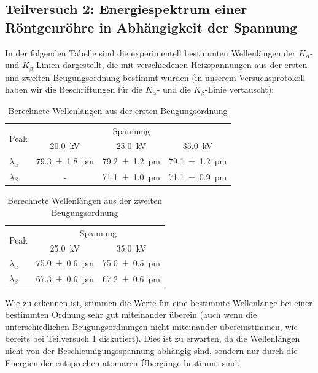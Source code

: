 \documentclass{article}
\begin{document}
\newpage


\subsection{Teilversuch 2: Energiespektrum einer Röntgenröhre
in Abhängigkeit der Spannung}


In der folgenden Tabelle sind die experimentell bestimmten Wellenlängen
der $K_\alpha$- und $K_\beta$-Linien dargestellt, die mit verschiedenen
Heizspannungen aus der ersten und zweiten Beugungsordnung bestimmt wurden
(in unserem Versuchsprotokoll haben wir die Beschriftungen für die $K_\alpha$-
und die $K_\beta$-Linie vertauscht):

\begin{table}[H]
    \centering
    \begin{tabular}{|l|ccc|}
        \hline
        \multirow{2}{*}{Peak} & \multicolumn{3}{c|}{Spannung} \\
        & \qty{20.0}{\kV} & \qty{25.0}{\kV} & \qty{35.0}{\kV} \\
        \hline
        $\lambda_\alpha$ & \qty{79.3 \pm 1.8}{\pm} & \qty{79.2 \pm 1.2}{\pm}
        & \qty{79.1 \pm 1.2}{\pm} \\
        $\lambda_\beta$ & - & \qty{71.1 \pm 1.0}{\pm} & \qty{71.1 \pm 0.9}{\pm} \\
        \hline
    \end{tabular}
    \caption{Berechnete Wellenlängen aus der ersten Beugungsordnung}
\end{table}

\begin{table}[H]
    \centering
    \begin{tabular}{|l|cc|}
        \hline
        \multirow{2}{*}{Peak} & \multicolumn{2}{c|}{Spannung} \\
        & \qty{25.0}{\kV} & \qty{35.0}{\kV} \\
        \hline
        $\lambda_\alpha$ & \qty{75.0 \pm 0.6}{\pm} & \qty{75.0 \pm 0.5}{\pm} \\
        $\lambda_\beta$ & \qty{67.3 \pm 0.6}{\pm} & \qty{67.2 \pm 0.6}{\pm} \\
        \hline
    \end{tabular}
    \caption{Berechnete Wellenlängen aus der zweiten Beugungsordnung}
\end{table}

Wie zu erkennen ist, stimmen die Werte für eine bestimmte Wellenlänge
bei einer bestimmten Ordnung sehr gut miteinander überein (auch wenn die
unterschiedlichen Beugungsordnungen nicht miteinander übereinstimmen,
wie bereits bei Teilversuch 1 diskutiert).
Dies ist zu erwarten, da die Wellenlängen nicht von der Beschleunigungsspannung
abhängig sind, sondern nur durch die Energien der entsprechen atomaren Übergänge
bestimmt sind.
\end{document}
